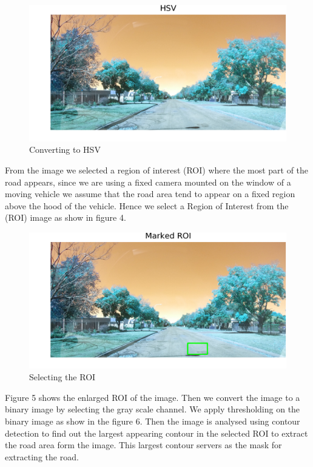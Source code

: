 \documentclass[journal]{IEEEtran}
\begin{document}
\begin{figure}[!htb]
\begin{center}
\includegraphics[scale=1]{Images/1_HSV.png}
\end{center}
\caption{Converting to HSV}
\end{figure}

\vspace{0.5cm}

\noindent From the image we selected a region of interest (ROI) where the most part of the road appears, since we are using a fixed camera mounted on the window of a moving vehicle we assume that the road area tend to appear on a fixed region above the hood of the vehicle. Hence we select a Region of Interest from the (ROI) image as show in figure 4.

\begin{figure}[!htb]
\begin{center}
\includegraphics[scale=1]{Images/2_Marked_ROI.png}
\end{center}
\caption{Selecting the ROI}
\end{figure}

\vspace{0.5cm}
\noindent Figure 5 shows the enlarged ROI of the image. Then we convert the image to a binary image by selecting the gray scale channel. We apply thresholding on the binary image as show in the figure 6. Then the image is analysed using contour detection to find out the largest appearing contour in the selected ROI to extract the road area form the image. This largest contour servers as the mask for extracting the road. 
\end{document}

